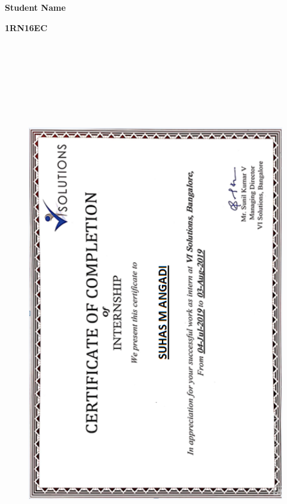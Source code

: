 \vspace{1.5cm}

\begin{flushright}\textbf{Student Name}\end{flushright}
\begin{flushright}\small\textbf{1RN16EC}\end{flushright}

\begin{figure}[h]
	\centering
	\includegraphics[height=24cm, width=15cm]{images/certificate.png}
\end{figure}